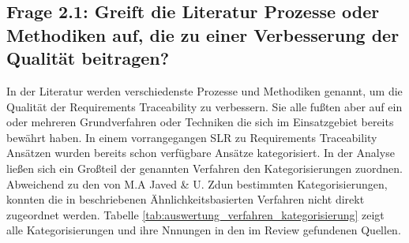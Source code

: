 \subsection{Frage 2.1: Greift die Literatur Prozesse oder Methodiken auf, die zu einer Verbesserung der Qualität beitragen?}
In der Literatur werden verschiedenste Prozesse und Methodiken genannt, um die Qualität der Requirements Traceability zu verbessern. Sie alle fußten aber auf ein oder mehreren Grundverfahren oder Techniken die sich im Einsatzgebiet bereits bewährt haben. In einem vorrangegangen SLR zu Requirements Traceability Ansätzen \cite{Javed2014ACode} wurden bereits schon verfügbare Ansätze kategorisiert. In der Analyse ließen sich ein Großteil der genannten Verfahren den Kategorisierungen zuordnen. Abweichend zu den von M.A Javed \& U. Zdun bestimmten Kategorisierungen, konnten die in \cite{Tsuchiya2015InteractiveLogs, Omoronyia2011ExploringTraceability, Leuser2010TacklingSpecifications, Spanoudakis2004Rule-basedRelations}beschriebenen Ähnlichkeitsbasierten Verfahren nicht direkt zugeordnet werden. Tabelle \ref{tab:auswertung_verfahren_kategorisierung} zeigt alle Kategorisierungen und ihre Nnnungen in den im Review gefundenen Quellen.

